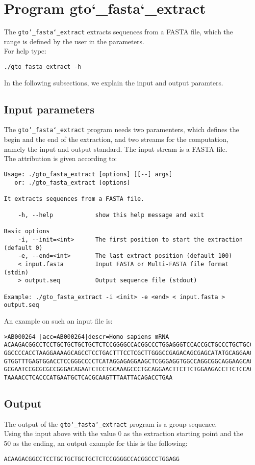 \section{Program gto\char`_fasta\char`_extract}
The \texttt{gto\char`_fasta\char`_extract} extracts sequences from a FASTA file, which the range is defined by the user in the parameters.\\
For help type:
\begin{lstlisting}
./gto_fasta_extract -h
\end{lstlisting}
In the following subsections, we explain the input and output paramters.

\subsection*{Input parameters}

The \texttt{gto\char`_fasta\char`_extract} program needs two paramenters, which defines the begin and the end of the extraction, and two streams for the computation, namely the input and output standard. The input stream is a FASTA file.\\
The attribution is given according to:
\begin{lstlisting}
Usage: ./gto_fasta_extract [options] [[--] args]
   or: ./gto_fasta_extract [options]

It extracts sequences from a FASTA file.

    -h, --help            show this help message and exit

Basic options
    -i, --init=<int>      The first position to start the extraction (default 0)
    -e, --end=<int>       The last extract position (default 100)
    < input.fasta         Input FASTA or Multi-FASTA file format (stdin)
    > output.seq          Output sequence file (stdout)

Example: ./gto_fasta_extract -i <init> -e <end> < input.fasta > output.seq
\end{lstlisting}
An example on such an input file is:
\begin{lstlisting}
>AB000264 |acc=AB000264|descr=Homo sapiens mRNA 
ACAAGACGGCCTCCTGCTGCTGCTGCTCTCCGGGGCCACGGCCCTGGAGGGTCCACCGCTGCCCTGCTGCCATTGTCCCC
GGCCCCACCTAAGGAAAAGCAGCCTCCTGACTTTCCTCGCTTGGGCCGAGACAGCGAGCATATGCAGGAAGCGGCAGGAA
GTGGTTTGAGTGGACCTCCGGGCCCCTCATAGGAGAGGAAGCTCGGGAGGTGGCCAGGCGGCAGGAAGCAGGCCAGTGCC
GCGAATCCGCGCGCCGGGACAGAATCTCCTGCAAAGCCCTGCAGGAACTTCTTCTGGAAGACCTTCTCCACCCCCCCAGC
TAAAACCTCACCCATGAATGCTCACGCAAGTTTAATTACAGACCTGAA
\end{lstlisting}

\subsection*{Output}
The output of the \texttt{gto\char`_fasta\char`_extract} program is a group sequence.\\
Using the input above with the value 0 as the extraction starting point and the 50 as the ending, an output example for this is the following:
\begin{lstlisting}
ACAAGACGGCCTCCTGCTGCTGCTGCTCTCCGGGGCCACGGCCCTGGAGG
\end{lstlisting}